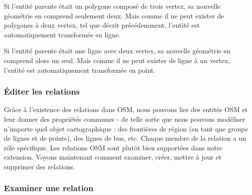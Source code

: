 Si l'entité parente était un polygone composé de trois vertex, sa nouvelle géométrie en comprend seulement deux. Mais comme il ne peut exister de polygones à deux vertex, tel que décrit précédemment, l'entité est automatiquement transformée en ligne.

Si l'entité parente était une ligne avec deux vertex, sa nouvelle géométrie en comprend alors un seul. Mais comme il ne peut exister de ligne à un vertex, l'entité est automatiquement transformée en point.

\subsubsection{Éditer les relations}\label{editing_osm_relation}

Grâce à l'existence des relations dans OSM, nous pouvons lier des entités OSM et leur donner des propriétés communes - de telle sorte que nous pouvons modéliser n'importe quel objet cartographique : des frontières de région (en tant que groupe de lignes et de points), des lignes de bus, etc. Chaque membre de la relation a un rôle spécifique. Les relations OSM sont plutôt bien supportées dans notre extension. Voyons maintenant comment examiner, créer, mettre à jour et supprimer des relations.

\subsubsection{Examiner une relation}\label{examrelation}

